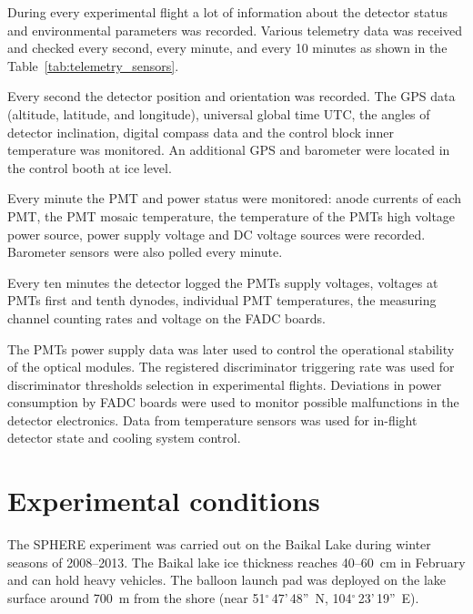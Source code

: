 \documentclass[universe,article,submit,moreauthors,pdftex]{Definitions/mdpi}
\begin{document}
During every experimental flight a lot of information about the detector status and environmental parameters was recorded. Various telemetry data was received and checked every second, every minute, and every 10 minutes as shown in the Table~\ref{tab:telemetry_sensors}.

Every second the detector position and orientation was recorded. The GPS data (altitude, latitude, and longitude), universal global time UTC, the angles of detector inclination, digital compass data and the control block inner temperature was monitored. An additional GPS and barometer were located in the control booth at ice level.

Every minute the PMT and power status were monitored: anode currents of each PMT, the PMT mosaic temperature, the temperature of the PMTs high voltage power source, power supply voltage and DC voltage sources were recorded. Barometer sensors were also polled every minute.

Every ten minutes the detector logged the PMTs supply voltages, voltages at PMTs first and tenth dynodes, individual PMT temperatures, the measuring channel counting rates and voltage on the FADC boards.

The PMTs power supply data was later used to control the operational stability of the optical modules. The registered discriminator triggering rate was used for discriminator thresholds selection in experimental flights. Deviations in power consumption by FADC boards were used to monitor possible malfunctions in the detector electronics. Data from temperature sensors was used for in-flight detector state and cooling system control.


\section{Experimental conditions}
\label{sect:data}
 
The SPHERE experiment was carried out on the Baikal Lake during winter seasons of 2008--2013. The Baikal lake ice thickness reaches 40--60~cm in February and can hold heavy vehicles. The balloon launch pad was deployed on the lake surface around 700~m from the shore (near 51$^\circ$\,47'\,48''~N, 104$^\circ$\,23'\,19''~E).
\end{document}
